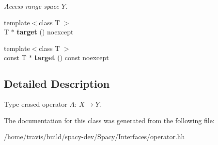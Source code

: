 \begin{DoxyCompactItemize}
\begin{DoxyCompactList}\small\item\em Access range space $Y$. \end{DoxyCompactList}\item 
\hypertarget{classSpacy_1_1Operator_afabc47b5debc681bb985865adc0e9fa1}{{\footnotesize template$<$class T $>$ }\\T $\ast$ {\bfseries target} () noexcept}\label{classSpacy_1_1Operator_afabc47b5debc681bb985865adc0e9fa1}

\item 
\hypertarget{classSpacy_1_1Operator_af4f5fc9968599011c56a59665fe42e0a}{{\footnotesize template$<$class T $>$ }\\const T $\ast$ {\bfseries target} () const noexcept}\label{classSpacy_1_1Operator_af4f5fc9968599011c56a59665fe42e0a}

\end{DoxyCompactItemize}


\subsection{Detailed Description}
Type-\/erased operator $A:\ X \to Y $. 

The documentation for this class was generated from the following file\-:\begin{DoxyCompactItemize}
\item 
/home/travis/build/spacy-\/dev/\-Spacy/\-Interfaces/operator.\-hh\end{DoxyCompactItemize}

